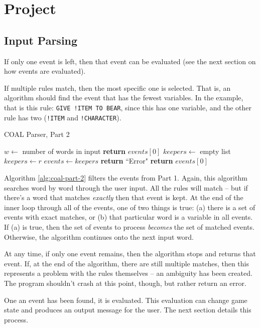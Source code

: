 \documentclass{article}
\newcommand{\enterProblemHeader}[1]{
}
\newcommand{\exitProblemHeader}[1]{
\nobreak\extramarks{#1}{}\nobreak
}
\newcounter{homeworkProblemCounter} %
\newcommand{\homeworkProblemName}{}
\newenvironment{homeworkProblem}[1][Problem \arabic{homeworkProblemCounter}]{ %
\stepcounter{homeworkProblemCounter} %
\renewcommand{\homeworkProblemName}{#1} %
\section{\homeworkProblemName} %
\enterProblemHeader{\homeworkProblemName} %
}{
\exitProblemHeader{\homeworkProblemName} %
}
\newcommand{\homeworkSectionName}{}
\newenvironment{homeworkSection}[1]{ %
\renewcommand{\homeworkSectionName}{#1} %
\subsection{\homeworkSectionName} %
\enterProblemHeader{\homeworkProblemName\ [\homeworkSectionName]} %
}{
\enterProblemHeader{\homeworkProblemName} %
}
\begin{document}
\begin{homeworkProblem}[Project]
\begin{homeworkSection}{Input Parsing}
	If only one event is left, then that event can be evaluated (see the next section on how events are evaluated).

	If multiple rules match, then the most specific one is selected. That is, an algorithm should find the event that has the fewest variables. In the example, that is this rule: \texttt{GIVE !ITEM TO BEAR}, since this has one variable, and the other rule has two (\texttt{!ITEM} and \texttt{!CHARACTER}).

	\begin{algorithm}
		\caption{COAL Parser, Part 2}
		\label{alg:coal-part-2}
		\begin{algorithmic}
				\State $w \gets$ number of words in input
						\State \textbf{return} $events[0]$
					\EndIf
					\State $keepers \gets$ empty list
							\State $keepers \gets r$
						\EndIf
					\EndFor
						\State $events \gets keepers$
					\EndIf
				\EndFor
					\State \textbf{return} ``Error"
				\EndIf
				\State \textbf{return} $events[0]$
			\EndProcedure
		\end{algorithmic}
	\end{algorithm}

	Algorithm \ref{alg:coal-part-2} filters the events from Part 1. Again, this algorithm searches word by word through the user input. All the rules will match -- but if there's a word that matches \textit{exactly} then that event is kept. At the end of the inner loop through all of the events, one of two things is true: (a) there is a set of events with exact matches, or (b) that particular word is a variable in all events. If (a) is true, then the set of events to process \textit{becomes} the set of matched events. Otherwise, the algorithm continues onto the next input word.

	At any time, if only one event remains, then the algorithm stops and returns that event. If, at the end of the algorithm, there are still multiple matches, then this represents a problem with the rules themselves -- an ambiguity has been created. The program shouldn't crash at this point, though, but rather return an error.

	One an event has been found, it is evaluated. This evaluation can change game state and produces an output message for the user. The next section details this process.


\end{homeworkSection}
\end{homeworkProblem}
\end{document}
